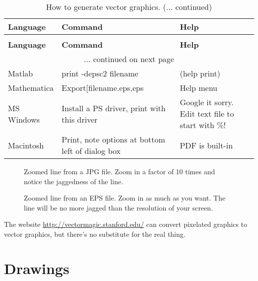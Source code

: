 \documentclass[a4paper]{article}
\newlength{\DUtablewidth} %
\begin{document}
\setlength{\DUtablewidth}{\linewidth}
\begin{longtable}[c]{|p{0.179\DUtablewidth}|p{0.342\DUtablewidth}|p{0.179\DUtablewidth}|}
\caption{How to generate vector graphics.}\\
\hline
\textbf{%
Language
} & \textbf{%
Command
} & \textbf{%
Help
} \\
\hline
\endfirsthead
\caption[]{How to generate vector graphics. (... continued)}\\
\hline
\textbf{%
Language
} & \textbf{%
Command
} & \textbf{%
Help
} \\
\hline
\endhead
\multicolumn{3}{c}{\hfill ... continued on next page} \\
\endfoot
\endlastfoot

Matlab
 & 
print -depsc2 filename
 & 
(help print)
 \\
\hline

Mathematica
 & 
Export{[}\textquotedbl{}filename.eps\textquotedbl{},\textquotedbl{}eps\textquotedbl{}{]}
 & 
Help menu
 \\
\hline

MS Windows
 & 
Install a PS driver, print
with this driver
 & 
Google it
sorry. Edit
text file to
start with \%!
 \\
\hline

Macintosh
 & 
Print, note options at
bottom left of dialog box
 & 
PDF is
built-in
 \\
\hline
\end{longtable}
\label{table}

\begin{figure}
\label{figure1}
\noindent{}
\caption{Zoomed line from a JPG file. Zoom in a factor of 10 times and
notice the jaggedness of the line.}
\end{figure}

\begin{figure}
\label{figure2}
\noindent{}
\caption{Zoomed line from an EPS file. Zoom in as much as you want. The line will be no more jagged than the resolution of your screen.}
\end{figure}

The website \url{http://vectormagic.stanford.edu/} can convert pixelated
graphics to vector graphics, but there’s no substitute for the real
thing.


\section{Drawings%
  \label{drawings}%
}
\end{document}
